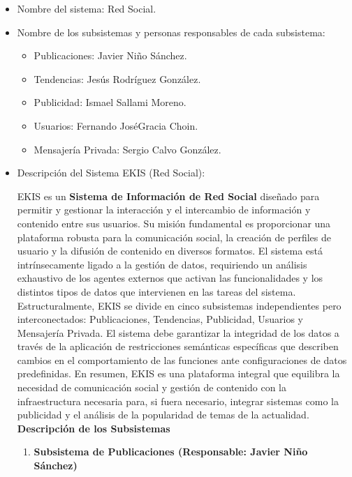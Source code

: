 \documentclass[twoside,openright,titlepage,numbers=noenddot,headinclude,footinclude=true,
cleardoublepage=empty,abstractoff,BCOR=5mm,paper=a4,fontsize=12pt,main=spanish,pdfstartpage=1]{scrreprt}
\theoremstyle{plain}
\begin{document}
\begin{itemize}
  \item Nombre del sistema: Red Social.
  \item Nombre de los subsistemas y personas responsables de cada subsistema:
    \begin{itemize}
      \item Publicaciones: Javier Niño Sánchez.
      \item Tendencias: Jesús Rodríguez González.
      \item Publicidad: Ismael Sallami Moreno.
      \item Usuarios: Fernando JoséGracia Choin.
      \item Mensajería Privada: Sergio Calvo González.
    \end{itemize}

    \item Descripción del Sistema EKIS (Red Social): 

    EKIS es un \textbf{Sistema de Información de Red Social} diseñado para permitir y gestionar la interacción y el intercambio de información y contenido entre sus usuarios. Su misión fundamental es proporcionar una plataforma robusta para la comunicación social, la creación de perfiles de usuario y la difusión de contenido en diversos formatos. El sistema está intrínsecamente ligado a la gestión de datos, requiriendo un análisis exhaustivo de los agentes externos que activan las funcionalidades y los distintos tipos de datos que intervienen en las tareas del sistema. Estructuralmente, EKIS se divide en cinco subsistemas independientes pero interconectados: Publicaciones, Tendencias, Publicidad, Usuarios y Mensajería Privada. El sistema debe garantizar la integridad de los datos a través de la aplicación de restricciones semánticas específicas que describen cambios en el comportamiento de las funciones ante configuraciones de datos predefinidas. En resumen, EKIS es una plataforma integral que equilibra la necesidad de comunicación social y gestión de contenido con la infraestructura necesaria para, si fuera necesario, integrar sistemas como la publicidad y el análisis de la popularidad de temas de la actualidad. \\

    \textbf{Descripción de los Subsistemas}

    \begin{enumerate}
      \item \textbf{Subsistema de Publicaciones (Responsable: Javier Niño Sánchez)}


\end{enumerate}
\end{itemize}
\end{document}

